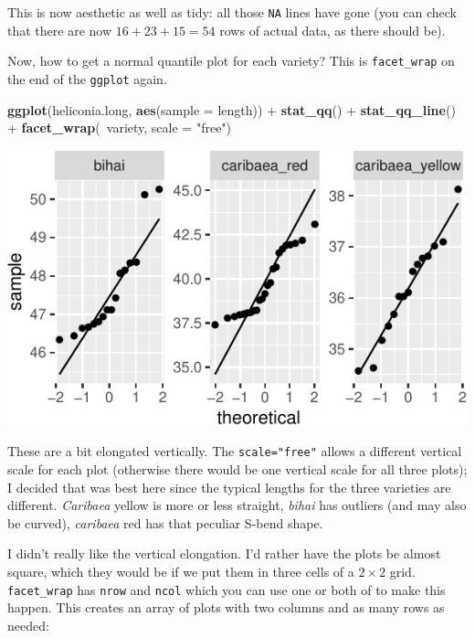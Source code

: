 \documentclass[]{tufte-book}
\newenvironment{Shaded}{}{}
\newcommand{\DataTypeTok}[1]{\textcolor[rgb]{0.56,0.13,0.00}{#1}}
\newcommand{\KeywordTok}[1]{\textcolor[rgb]{0.00,0.44,0.13}{\textbf{#1}}}
\newcommand{\NormalTok}[1]{#1}
\newcommand{\OperatorTok}[1]{\textcolor[rgb]{0.40,0.40,0.40}{#1}}
\newcommand{\StringTok}[1]{\textcolor[rgb]{0.25,0.44,0.63}{#1}}
\theoremstyle{definition}
\theoremstyle{definition}
\theoremstyle{definition}
\theoremstyle{remark}
\begin{document}
This is now aesthetic as well as tidy: all those \texttt{NA} lines have
gone (you can check that there are now \(16+23+15=54\) rows of actual
data, as there should be).

Now, how to get a normal quantile plot for each variety? This is
\texttt{facet\_wrap} on the end of the \texttt{ggplot} again.

\begin{Shaded}
\begin{Highlighting}[]
\KeywordTok{ggplot}\NormalTok{(heliconia.long, }\KeywordTok{aes}\NormalTok{(}\DataTypeTok{sample =}\NormalTok{ length)) }\OperatorTok{+}\StringTok{ }
\StringTok{    }\KeywordTok{stat_qq}\NormalTok{() }\OperatorTok{+}\StringTok{ }\KeywordTok{stat_qq_line}\NormalTok{() }\OperatorTok{+}\StringTok{ }\KeywordTok{facet_wrap}\NormalTok{(}\OperatorTok{~}\NormalTok{variety, }
    \DataTypeTok{scale =} \StringTok{"free"}\NormalTok{)}
\end{Highlighting}
\end{Shaded}

\includegraphics{09-normal-quantile_files/figure-latex/unnamed-chunk-8-1}

These are a bit elongated vertically. The \texttt{scale="free"} allows a
different vertical scale for each plot (otherwise there would be one
vertical scale for all three plots); I decided that was best here since
the typical lengths for the three varieties are different.
\emph{Caribaea} yellow is more or less straight, \emph{bihai} has
outliers (and may also be curved), \emph{caribaea} red has that peculiar
S-bend shape.

I didn't really like the vertical elongation. I'd rather have the plots
be almost square, which they would be if we put them in three cells of a
\(2 \times 2\) grid. \texttt{facet\_wrap} has \texttt{nrow} and
\texttt{ncol} which you can use one or both of to make this happen. This
creates an array of plots with two columns and as many rows as needed:
\end{document}
